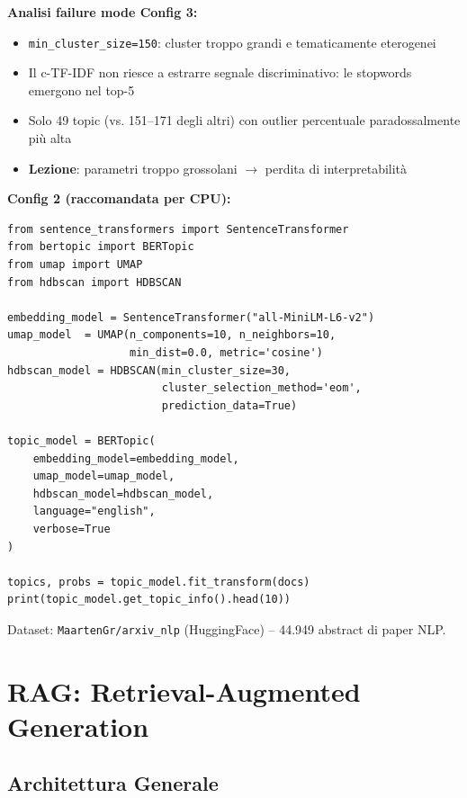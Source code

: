 \documentclass[12pt,a4paper]{article}
\begin{document}
\textbf{Analisi failure mode Config 3:}

\begin{itemize}
  \item \texttt{min\_cluster\_size=150}: cluster troppo grandi e tematicamente eterogenei
  \item Il c-TF-IDF non riesce a estrarre segnale discriminativo: le stopwords emergono nel top-5
  \item Solo 49 topic (vs. 151--171 degli altri) con outlier percentuale paradossalmente pi\`u alta
  \item \textbf{Lezione}: parametri troppo grossolani $\to$ perdita di interpretabilit\`a
\end{itemize}

\textbf{Config 2 (raccomandata per CPU):}

\begin{codebox}
\begin{lstlisting}[style=python]
from sentence_transformers import SentenceTransformer
from bertopic import BERTopic
from umap import UMAP
from hdbscan import HDBSCAN

embedding_model = SentenceTransformer("all-MiniLM-L6-v2")
umap_model  = UMAP(n_components=10, n_neighbors=10,
                   min_dist=0.0, metric='cosine')
hdbscan_model = HDBSCAN(min_cluster_size=30,
                        cluster_selection_method='eom',
                        prediction_data=True)

topic_model = BERTopic(
    embedding_model=embedding_model,
    umap_model=umap_model,
    hdbscan_model=hdbscan_model,
    language="english",
    verbose=True
)

topics, probs = topic_model.fit_transform(docs)
print(topic_model.get_topic_info().head(10))
\end{lstlisting}
\end{codebox}

Dataset: \texttt{MaartenGr/arxiv\_nlp} (HuggingFace) -- 44.949 abstract di paper NLP.

\section{RAG: Retrieval-Augmented Generation}

\subsection{Architettura Generale}\label{sec:lab5-detail}
\end{document}

